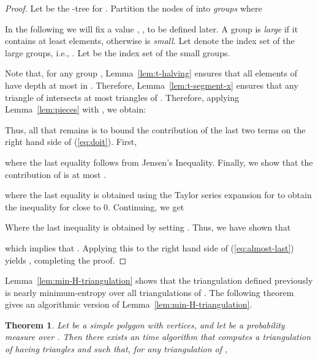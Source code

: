 \documentclass[lotsofwhite]{patmorin}
\newcommand{\eqrefx}[1]{(\ref{eq:#1})}
\newtheorem{thm}{Theorem}{\bfseries}{\itshape}
\newcommand{\thmlabel}[1]{\label{thm:#1}}
\newcommand{\lemref}[1]{Lemma~\ref{lem:#1}}
\begin{document}
\begin{proof}
Let  be the -tree for .
Partition the nodes of  into
\emph{groups}  where

In the following we will fix a value , , to be
defined later.  A group  is \emph{large} if it contains at least
 elements, otherwise  is \emph{small}.  Let 
denote the index set of the large groups, i.e., .  Let  be the index
set of the small groups.

Note that, for any group , \lemref{t-halving} ensures that all
elements of  have depth at most  in .  Therefore, 
\lemref{t-segment-x} ensures that any triangle of
 intersects at most  
triangles of .  Therefore,
applying \lemref{pieces} with , we obtain:

Thus, all that remains is to bound the contribution of the last two
terms on the right hand side of \eqrefx{doit}.  First,

where the last equality follows from Jensen's Inequality.
Finally, we show that the contribution of  is at most
. 

where the last equality is obtained using the Taylor series expansion
for  to obtain the inequality 
for  close to 0.  Continuing, we get 
 
Where the last inequality is obtained by setting 
.  Thus, we have shown that

which implies that .  Applying this to
the right hand side of \eqrefx{almost-last} yields , completing the proof.
\end{proof}

\lemref{min-H-triangulation} shows that the triangulation
 defined previously is nearly minimum-entropy over
all triangulations of .  The following theorem gives an algorithmic
version of \lemref{min-H-triangulation}.

\begin{thm}\thmlabel{min-H-triangulation}
Let  be a simple polygon with  vertices, and let  be a
probability measure over .  Then there exists an 
time algorithm that computes a triangulation  of  having
 triangles and such that, for any triangulation  of
,

\end{thm}
\end{document}
